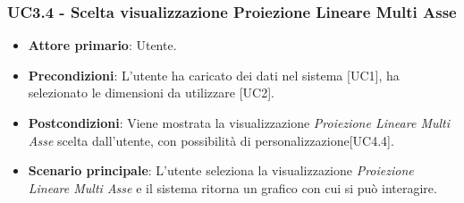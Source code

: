 \subsubsection{UC3.4 - Scelta visualizzazione Proiezione Lineare Multi Asse}

\begin{itemize}
	\item \textbf{Attore primario}: Utente.
	\item \textbf{Precondizioni}: L'utente ha caricato dei dati nel sistema [UC1], ha selezionato le dimensioni da utilizzare [UC2].
	\item \textbf{Postcondizioni}: Viene mostrata la visualizzazione \textit{Proiezione Lineare Multi Asse} scelta dall'utente, con possibilità di personalizzazione[UC4.4].
	\item \textbf{Scenario principale}: L'utente seleziona la visualizzazione \textit{Proiezione Lineare Multi Asse} e il sistema ritorna un grafico con cui si può interagire.
\end{itemize}